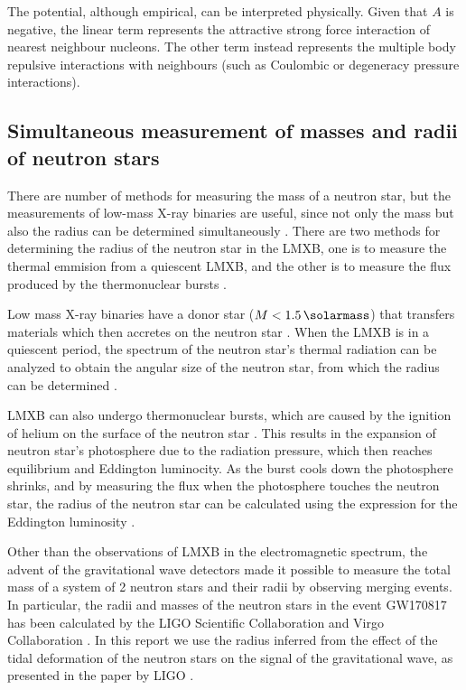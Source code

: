 \documentclass[draft,11pt]{article}
\theoremstyle{definition}
\theoremstyle{remark}
\begin{document}
                The potential, although empirical, can be interpreted physically. Given that $A$ is negative, the linear term represents the attractive strong force interaction of nearest neighbour nucleons. The other term instead represents the multiple body repulsive interactions with neighbours \parencite{bludman.dover.1980/extrapolation.skyrme.eos} (such as Coulombic or degeneracy pressure interactions).
            
        \subsection{Simultaneous measurement of masses and radii of neutron stars}
            There are number of methods for measuring the mass of a neutron star, but the measurements of low-mass X-ray binaries are useful, since not only the mass but also the radius can be determined simultaneously \parencite{ozel.paulo.2016/masses.radii.eos}. There are two methods for determining the radius of the neutron star in the LMXB, one is to measure the thermal emmision from a quiescent LMXB, and the other is to measure the flux produced by the thermonuclear bursts \parencite{ozel.paulo.2016/masses.radii.eos}.
            
            Low mass X-ray binaries have a donor star ($M<\SI{1.5}{\solarmass}$) that transfers materials which then accretes on the neutron star \parencite{tauris.2003/xray.binary}. When the LMXB is in a quiescent period, the spectrum of the neutron star's thermal radiation can be analyzed to obtain the angular size of the neutron star, from which the radius can be determined \parencite{ozel.psaltis.2016/radius.oberve}.
            
            LMXB can also undergo thermonuclear bursts, which are caused by the ignition of helium on the surface of the neutron star \parencite{ozel.paulo.2016/masses.radii.eos}. This results in the expansion of neutron star's photosphere due to the radiation pressure, which then reaches equilibrium and Eddington luminocity. As the burst cools down the photosphere shrinks, and by measuring the flux when the photosphere touches the neutron star, the radius of the neutron star can be calculated using the expression for the Eddington luminosity \parencite{ozel.psaltis.2016/radius.oberve}.
            
           Other than the observations of LMXB in the electromagnetic spectrum, the advent of the gravitational wave detectors made it possible to measure the total mass of a system of 2 neutron stars and their radii by observing merging events. In particular, the  radii and masses of the neutron stars in the event GW170817 has been calculated by the LIGO Scientific Collaboration and Virgo Collaboration \cite{ligo.virgo.2019/prop.of.ns.merger.GW170817,ligo.virgo.2018/GW170817.ns.radii}. In this report we use the radius inferred from the effect of the tidal deformation of the neutron stars on the signal of the gravitational wave, as presented in the paper by LIGO \cite{ligo.virgo.2018/GW170817.ns.radii}.
    
\end{document}
